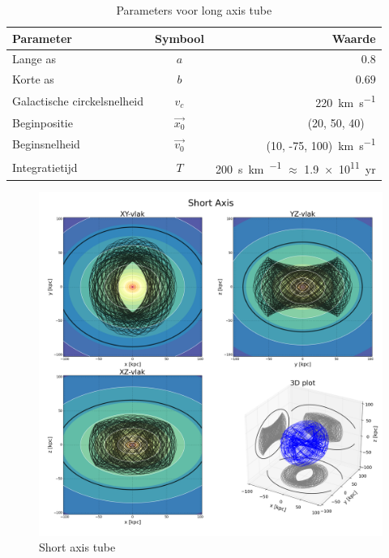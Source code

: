 \documentclass[11pt,a4paper,twoside,dutch]{article}
\begin{document}
\begin{table}[b]
\centering
\begin{tabular}{lcr}
	\hline
	\textbf{Parameter} & \textbf{Symbool} & \textbf{Waarde} \\
	\hline
	Lange as & $a$ & $0.8$\\
	Korte as & $b$ & $0.69$\\
	Galactische circkelsnelheid & $v_c$ & \SI{220}{\kilo\meter\per\second}\\
	Beginpositie & $\vec{x_0}$ & (20, 50, 40)~\si{\kilo\parsec}\\
	Beginsnelheid & $\vec{v_0}$ & (10, -75, 100)~\si{\kilo\meter\per\second}\\
	Integratietijd & $T$ & \SI{200}{\second\kilo\meter\per\parsec} $\approx$ \num{1.9e11}~yr \\
	\hline
\end{tabular}
\caption{Parameters voor long axis tube}
\label{tab:longparam}
\end{table}

\newpage
\begin{figure}[t]
\centering
\includegraphics[width=1\textwidth]{img/short.png}
\caption{Short axis tube}
\label{fig:shortplot}
\end{figure}
\end{document}
